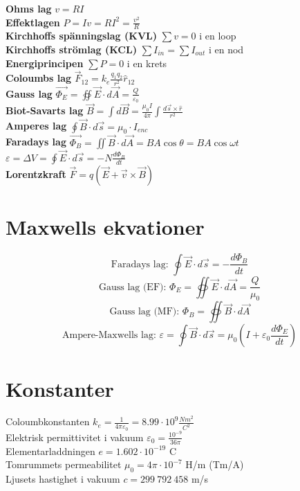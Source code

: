 \documentclass{article}
\begin{document}
\textbf{Ohms lag} \tab  $ v=RI $
\\
\textbf{Effektlagen} \tab  $ P = Iv = RI^2 = \frac{v^2}{R} $
\\
\textbf{Kirchhoffs spänningslag (KVL)} \tab $ \sum v = 0 $  i en loop
\\
\textbf{Kirchhoffs strömlag (KCL)} \tab $ \sum I_{in} = \sum I_{out} $  i en nod
\\
\textbf{Energiprincipen} \tab $ \sum P = 0 $ i en krets
\\
\textbf{Coloumbs lag} \tab \( \vec{F}_{12} = k_e \frac{q_1q_2}{r^2} \hat{r}_{12} \)
\\
\textbf{Gauss lag} \tab \( \vec{\Phi_E} = \oiint \vec{E} \cdot d\vec{A} = \frac{Q}{\varepsilon_0} \)
\\
\textbf{Biot-Savarts lag} \tab \( \vec{B} = \int d\vec{B} = \frac{\mu_0I}{4\pi} \int \frac{d\vec{s} \times \hat{r}}{r^2} \)
\\
\textbf{Amperes lag} \tab \( \oint \vec{B} \cdot d\vec{s} = \mu_0 \cdot I_{enc} \)
\\
\textbf{Faradays lag} \tab \( \vec{\Phi_B} = \iint \vec{B} \cdot d \vec{A} = BA \cos \theta = BA \cos \omega t \)
\\ 
\tab \tab \tab \( \varepsilon = \Delta V = \oint \vec{E} \cdot d \vec{s} = -N \frac{d \Phi_B}{dt} \)
\\
\textbf{Lorentzkraft} \tab \( \vec{F} = q(\vec{E} + \vec{v} \times \vec{B}) \)



\section{Maxwells ekvationer}
\[ \textrm{Faradays lag: } \oint \vec{E} \cdot d\vec{s} = -\frac{d\Phi_B}{dt} \]
\[ \textrm{Gauss lag (EF): } \Phi_E = \oiint \vec{E} \cdot d\vec{A} = \frac{Q}{\mu_0} \]
\[ \textrm{Gauss lag (MF): } \Phi_B = \oiint \vec{B} \cdot d\vec{A} \]
\[ \textrm{Ampere-Maxwells lag: } \varepsilon = \oint \vec{B} \cdot d\vec{s} = \mu_0 ( I + \varepsilon_0 \frac{d\Phi_E}{dt}) \]

\section{Konstanter}

Coloumbkonstanten \tab \( k_e = \frac{1}{4 \pi \varepsilon_0} = 8.99 \cdot 10^9 \frac{Nm^2}{C^2} \)
\\
Elektrisk permittivitet i vakuum \tab \( \varepsilon_0 = \frac{10^{-9}}{36 \pi} \)
\\
Elementarladdningen \tab \( e = 1.602 \cdot 10^{-19} \) C
\\
Tomrummets permeabilitet \tab \( \mu_0 = 4\pi \cdot 10^{-7} \) H/m (Tm/A)
\\
Ljusets hastighet i vakuum \tab \( c = 299~792~458 \) m/s
\end{document}
